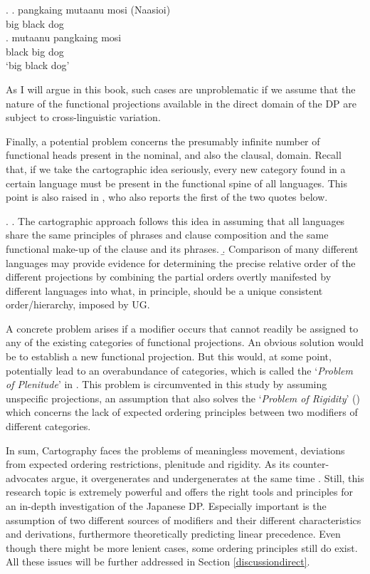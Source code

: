 \ex. \ag. pangkaing mutaanu mosi (Naasioi)\\
big black dog\\
\bg. mutaanu pangkaing mosi\\
black big dog\\
`big black dog’ \null \hfill \citep[428]{brown:2024:adj}

As I will argue in this book, such cases are unproblematic if we assume that the nature of the functional projections available in the direct domain of the DP are subject to cross-linguistic variation. 

Finally, a potential problem concerns the presumably infinite number of functional heads present in the nominal, and also the clausal, domain. Recall that, if we take the cartographic idea seriously, every new category found in a certain language must be present in the functional spine of all languages. This point is also raised in \citet{larson:2021:rethinking}, who also reports the first of the two quotes below.

\ex. \a. The cartographic approach follows this idea in assuming that all languages share the same principles of phrases and clause composition and the same functional make-up of the clause and its phrases. \citep[68]{cinriz:2010:carto}
\b. Comparison of many different languages may provide evidence for determining the precise relative order of the different projections by combining the partial orders overtly manifested by different languages into what, in principle, should be a unique consistent order/hierarchy, imposed by UG. \citep[72]{cinriz:2010:carto}

A concrete problem arises if a modifier occurs that cannot readily be assigned to any of the existing categories of functional projections. An obvious solution would be to establish a new functional projection. But this would, at some point, potentially lead to an overabundance of categories, which is called the `\textit{Problem of Plenitude}’ in \citet[248–249]{larson:2021:rethinking}. This problem is circumvented in this study by assuming unspecific projections, an assumption that also solves the `\textit{Problem of Rigidity}’ (\citealt[249–250]{larson:2021:rethinking}) which concerns the lack of expected ordering principles between two modifiers of different categories.  

In sum, Cartography faces the problems of meaningless movement, deviations from expected ordering restrictions, plenitude and rigidity. As its counter-advocates argue, it overgenerates and undergenerates at the same time \citep{larson:2021:rethinking, manzini:2025:left}. Still, this research topic is extremely powerful and offers the right tools and principles for an in-depth investigation of the Japanese DP. Especially important is the assumption of two different sources of modifiers and their different characteristics and derivations, furthermore theoretically predicting linear precedence. Even though there might be more lenient cases, some ordering principles still do exist. All these issues will be further addressed in Section \ref{discussiondirect}.


